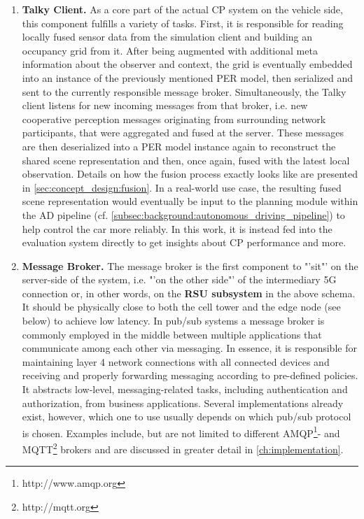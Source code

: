 \begin{enumerate}[C1: ]
	\item \textbf{Talky Client.} As a core part of the actual CP system on the vehicle side, this component fulfills a variety of tasks. First, it is responsible for reading locally fused sensor data from the simulation client and building an occupancy grid from it. After being augmented with additional meta information about the observer and context, the grid is eventually embedded into an instance of the previously mentioned PER model, then serialized and sent to the currently responsible message broker. Simultaneously, the Talky client listens for new incoming messages from that broker, i.e. new cooperative perception messages originating from surrounding network participants, that were aggregated and fused at the server. These messages are then deserialized into a PER model instance again to reconstruct the shared scene representation and then, once again, fused with the latest local observation. Details on how the fusion process exactly looks like are presented in \cref{sec:concept_design:fusion}. In a real-world use case, the resulting fused scene representation would eventually be input to the planning module within the AD pipeline (cf. \cref{subsec:background:autonomous_driving_pipeline}) to help control the car more reliably. In this work, it is instead fed into the evaluation system directly to get insights about CP performance and more.
	\item \textbf{Message Broker.} The message broker is the first component to "'sit"' on the server-side of the system, i.e. "'on the other side"' of the intermediary 5G connection or, in other words, on the \textbf{RSU subsystem} in the above schema. It should be physically close to both the cell tower and the edge node (see below) to achieve low latency. In pub/sub systems a message broker is commonly employed in the middle between multiple applications that communicate among each other via messaging. In essence, it is responsible for maintaining layer 4 network connections with all connected devices and receiving and properly forwarding messaging according to pre-defined policies. It abstracts low-level, messaging-related tasks, including authentication and authorization, from business applications. Several implementations already exist, however, which one to use usually depends on which pub/sub protocol is chosen. Examples include, but are not limited to different AMQP\footnote{http://www.amqp.org}- and MQTT\footnote{http://mqtt.org} brokers and are discussed in greater detail in \cref{ch:implementation}.

\end{enumerate}
